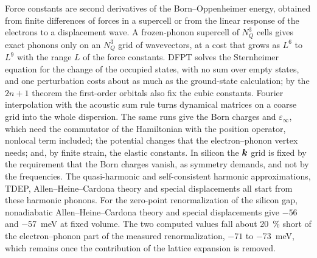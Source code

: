 Force constants are second derivatives of the Born--Oppenheimer energy, obtained from finite differences of forces in a supercell or from the linear response of the electrons to a displacement wave. A frozen-phonon supercell of $N_Q^3$ cells gives exact phonons only on an $N_Q^3$ grid of wavevectors, at a cost that grows as $L^6$ to $L^9$ with the range $L$ of the force constants. DFPT solves the Sternheimer equation for the change of the occupied states, with no sum over empty states, and one perturbation costs about as much as the ground-state calculation; by the $2n+1$ theorem the first-order orbitals also fix the cubic constants. Fourier interpolation with the acoustic sum rule turns dynamical matrices on a coarse grid into the whole dispersion. The same runs give the Born charges and $\varepsilon_\infty$, which need the commutator of the Hamiltonian with the position operator, nonlocal term included; the potential changes that the electron--phonon vertex needs; and, by finite strain, the elastic constants. In silicon the $\bm{k}$ grid is fixed by the requirement that the Born charges vanish, as symmetry demands, and not by the frequencies. The quasi-harmonic and self-consistent harmonic approximations, TDEP, Allen--Heine--Cardona theory and special displacements all start from these harmonic phonons. For the zero-point renormalization of the silicon gap, nonadiabatic Allen--Heine--Cardona theory and special displacements give $-56$ and \SI{-57}{meV} at fixed volume. The two computed values fall about \SI{20}{\percent} short of the electron--phonon part of the measured renormalization, $-71$ to \SI{-73}{meV}, which remains once the contribution of the lattice expansion is removed.

\printbibliography[heading=subbibliography]
